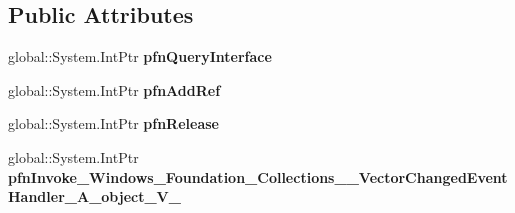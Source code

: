 \subsection*{Public Attributes}
\begin{DoxyCompactItemize}
\item 
\mbox{\label{struct_windows_1_1_foundation_1_1_collections_1_1_vector_changed_event_handler___a___system___object___v_______impl_1_1_vtbl_ad65191aa0d19e323c41eb37e2bb27ecf}} 
global\+::\+System.\+Int\+Ptr {\bfseries pfn\+Query\+Interface}
\item 
\mbox{\label{struct_windows_1_1_foundation_1_1_collections_1_1_vector_changed_event_handler___a___system___object___v_______impl_1_1_vtbl_a44543591e77c16860a829ca91386a70a}} 
global\+::\+System.\+Int\+Ptr {\bfseries pfn\+Add\+Ref}
\item 
\mbox{\label{struct_windows_1_1_foundation_1_1_collections_1_1_vector_changed_event_handler___a___system___object___v_______impl_1_1_vtbl_a287a783549e1e47dfa515a8743c48c62}} 
global\+::\+System.\+Int\+Ptr {\bfseries pfn\+Release}
\item 
\mbox{\label{struct_windows_1_1_foundation_1_1_collections_1_1_vector_changed_event_handler___a___system___object___v_______impl_1_1_vtbl_a55699eef982048e75a293c9f40597431}} 
global\+::\+System.\+Int\+Ptr {\bfseries pfn\+Invoke\+\_\+\+Windows\+\_\+\+Foundation\+\_\+\+Collections\+\_\+\+\_\+\+Vector\+Changed\+Event\+Handler\+\_\+\+A\+\_\+object\+\_\+\+V\+\_\+}
\end{DoxyCompactItemize}

